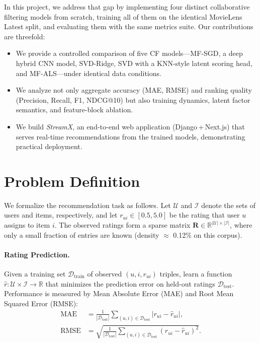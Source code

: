 \documentclass[11pt]{article}
\begin{document}
In this project, we address that gap by implementing four distinct collaborative filtering models from scratch, training all of them on the identical MovieLens Latest split, and evaluating them with the same metrics suite.
Our contributions are threefold:
\begin{itemize}
\item We provide a controlled comparison of five CF models---MF-SGD, a deep hybrid CNN model, SVD-Ridge, SVD with a KNN-style latent scoring head, and MF-ALS---under identical data conditions.
\item We analyze not only aggregate accuracy (MAE, RMSE) and ranking quality (Precision, Recall, F1, NDCG@10) but also training dynamics, latent factor semantics, and feature-block ablation.
\item We build \textit{StreamX}, an end-to-end web application (Django\,+\,Next.js) that serves real-time recommendations from the trained models, demonstrating practical deployment.
\end{itemize}



\section{Problem Definition}

We formalize the recommendation task as follows.
Let $\mathcal{U}$ and $\mathcal{I}$ denote the sets of users and items, respectively, and let $r_{ui}\in[0.5,5.0]$ be the rating that user $u$ assigns to item $i$.
The observed ratings form a sparse matrix $\mathbf{R}\in\mathbb{R}^{|\mathcal{U}|\times|\mathcal{I}|}$, where only a small fraction of entries are known (density $\approx$ 0.12\% on this corpus).

\paragraph{Rating Prediction.}
Given a training set $\mathcal{D}_\text{train}$ of observed $(u,i,r_{ui})$ triples, learn a function $\hat{r}:\mathcal{U}\times\mathcal{I}\to\mathbb{R}$ that minimizes the prediction error on held-out ratings $\mathcal{D}_\text{test}$.
Performance is measured by Mean Absolute Error (MAE) and Root Mean Squared Error (RMSE):
\begin{align}
\text{MAE} &= \frac{1}{|\mathcal{D}_\text{test}|}\sum_{(u,i)\in\mathcal{D}_\text{test}} |r_{ui}-\hat{r}_{ui}|, \\
\text{RMSE} &= \sqrt{\frac{1}{|\mathcal{D}_\text{test}|}\sum_{(u,i)\in\mathcal{D}_\text{test}} (r_{ui}-\hat{r}_{ui})^2}.
\end{align}
\end{document}
